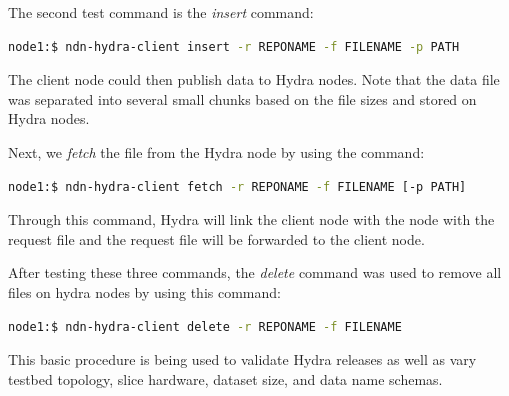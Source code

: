 The second test command is the \textit{insert} command: 
\begin{lstlisting}[language=bash]
  node1:$ ndn-hydra-client insert -r REPONAME -f FILENAME -p PATH
\end{lstlisting}
The client node could then publish data to Hydra nodes. Note that the data file was separated into several small chunks based on the file sizes and stored on Hydra nodes.

Next, we \textit{fetch} the file from the Hydra node by using the command: 
\begin{lstlisting}[language=bash]
  node1:$ ndn-hydra-client fetch -r REPONAME -f FILENAME [-p PATH]
\end{lstlisting}
Through this command, Hydra will link the client node with the node with the request file and the request file will be forwarded to the client node. 

After testing these three commands, the \textit{delete} command was used to remove all files on hydra nodes by using this command: 
\begin{lstlisting}[language=bash]
  node1:$ ndn-hydra-client delete -r REPONAME -f FILENAME
\end{lstlisting}


This basic procedure is being used to validate Hydra releases as well as vary testbed topology, slice hardware, dataset size, and data name schemas.